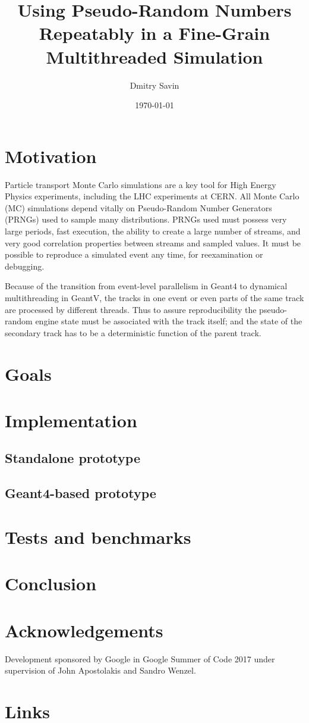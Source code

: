 \documentclass[a4paper, 12pt]{article} %
\title{Using Pseudo-Random Numbers Repeatably in a Fine-Grain Multithreaded Simulation}
\author{Dmitry Savin}
\date{\today}
\begin{document}
 \maketitle

 \section*{ Motivation }
  Particle transport Monte Carlo simulations are a key tool for High Energy Physics experiments, including the LHC experiments at CERN.
  All Monte Carlo (MC) simulations depend vitally on Pseudo-Random Number Generators (PRNGs) used to sample many distributions.
  PRNGs used must possess very large periods, fast execution, the ability to create a large number of streams, and very good correlation properties between streams and sampled values. It must be possible to reproduce a simulated event any time, for reexamination or debugging.

  Because of the transition from event-level parallelism in Geant4 to dynamical multithreading in GeantV, the tracks in one event or even parts of the same track are processed by different threads.
  Thus to assure reproducibility the pseudo-random engine state must be associated with the track itself;
  and the state of the secondary track has to be a deterministic function of the parent track.
  
 \section*{ Goals }
  
 \section*{ Implementation }
 
  \subsection*{ Standalone prototype }
 
  \subsection*{ Geant4-based prototype }
  
 \section*{ Tests and benchmarks }
 
 \section*{ Conclusion }
 
 \section*{ Acknowledgements }
  Development sponsored by Google in Google Summer of Code 2017 under supervision of John Apostolakis and Sandro Wenzel.
 
 \section*{ Links }
 
%  
%  
 
\end{document}
